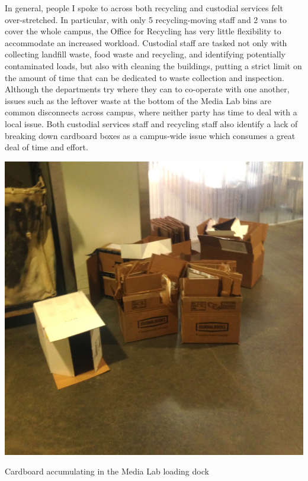 \documentclass[nofonts,nols,justified,nobib]{tufte-book}
\begin{document}
In general, people I spoke to across both recycling and custodial services felt over-stretched. In particular, with only 5 recycling-moving staff and 2 vans to cover the whole campus, the Office for Recycling has very little flexibility to accommodate an increased workload. Custodial staff are tasked not only with collecting landfill waste, food waste and recycling, and identifying potentially contaminated loads, but also with cleaning the buildings, putting a strict limit on the amount of time that can be dedicated to waste collection and inspection. Although the departments try where they can to co-operate with one another, issues such as the leftover waste at the bottom of the Media Lab bins are common disconnects across campus, where neither party has time to deal with a local issue. Both custodial services staff and recycling staff also identify a lack of breaking down cardboard boxes as a campus-wide issue which consumes a great deal of time and effort.


\begin{marginfigure}
  \includegraphics[width=1\linewidth]{img/2/mit-bins/loading1.JPG}
  \caption{Cardboard accumulating in the Media Lab loading dock}
\end{marginfigure}
\end{document}
